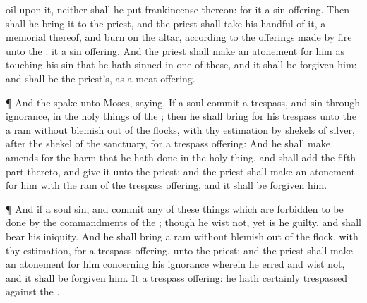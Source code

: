{oil upon it, neither shall he
put
{}
frankincense thereon: for it
{} a sin
offering.
Then shall he
bring it to the
priest, and the
priest shall
take his
handful of it,
{} a
memorial thereof, and
burn
{} on the
altar, according to the offerings made by
fire unto the
{}: it
{} a sin
offering.
And the
priest shall make an
atonement for him as touching his
sin that he hath
sinned in
one of these, and it shall be
forgiven him: and
{} shall be the
priest’s, as a meat
offering.
\par }{\PP {}¶ And the
{}
spake unto
Moses,
saying,
If a
soul
commit a
trespass, and
sin through
ignorance, in the holy
things of the
{}; then he shall
bring for his
trespass unto the
{} a
ram without
blemish out of the
flocks, with thy
estimation by
shekels of
silver, after the
shekel of the
sanctuary, for a trespass
offering:
And he shall make
amends for the
harm that he hath done in the holy
thing, and shall
add the fifth
part thereto, and
give it unto the
priest: and the
priest shall make an
atonement for him with the
ram of the trespass
offering, and it shall be
forgiven him.
\par }{\PP {}¶ And if a
soul
sin, and
commit
any of these things which are forbidden to be
done by the
commandments of the
{}; though he
wist
{} not, yet is he
guilty, and shall
bear his
iniquity.
And he shall
bring a
ram without
blemish out of the
flock, with thy
estimation, for a trespass
offering, unto the
priest: and the
priest shall make an
atonement for him concerning his
ignorance wherein he
erred and
wist
{} not, and it shall be
forgiven him.
It
{} a trespass
offering: he hath
certainly
trespassed against the
{}.

}
